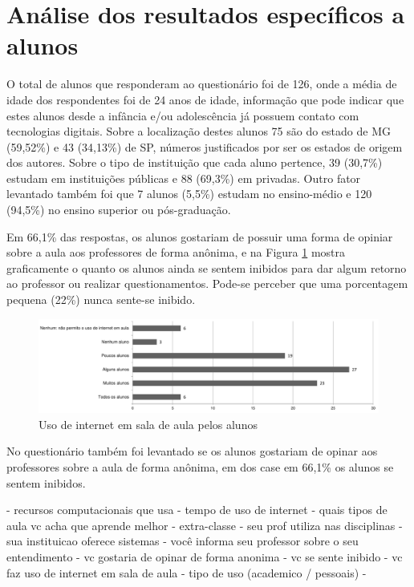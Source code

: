 \section{Análise dos resultados específicos a alunos}

O total de alunos que responderam ao questionário foi de 126, onde a média de idade dos respondentes foi de 24 anos de idade, informação que pode indicar que estes alunos desde a infância e/ou adolescência já possuem contato com tecnologias digitais. Sobre a localização destes alunos 75 são do estado de MG (59,52\%) e 43 (34,13\%) de SP, números justificados por ser os estados de origem dos autores. Sobre o tipo de instituição que cada aluno pertence, 39 (30,7\%) estudam em instituições públicas e 88 (69,3\%) em privadas. Outro fator levantado também foi que 7 alunos (5,5\%) estudam no ensino-médio e 120 (94,5\%) no ensino superior ou pós-graduação.

Em 66,1\% das respostas, os alunos gostariam de possuir uma forma de opiniar sobre a aula aos professores de forma anônima, e na Figura \ref{fig:grafico_inibido} mostra graficamente o quanto os alunos ainda se sentem inibidos para dar algum retorno ao professor ou realizar questionamentos. Pode-se perceber que uma porcentagem pequena (22\%) nunca sente-se inibido.

\begin{figure}[!h]
\centering
\includegraphics[width=1.0\textwidth]{pdfs/alunos-professores/pesquisa-uso-internet-sala.pdf} 
\caption{Uso de internet em sala de aula pelos alunos}
\label{fig:grafico_inibido} 
\end{figure}

No questionário também foi levantado se os alunos gostariam de opinar aos professores sobre a aula de forma anônima, em  dos case em 66,1\% os alunos se sentem inibidos.

- recursos computacionais que usa
- tempo de uso de internet
- quais tipos de aula vc acha que aprende melhor
- extra-classe
- seu prof utiliza nas disciplinas
- sua instituicao oferece sistemas
- você informa seu professor sobre o seu entendimento
- vc gostaria de opinar de forma anonima
- vc se sente inibido
- vc faz uso de internet em sala de aula
- tipo de uso (academico / pessoais)
- 

